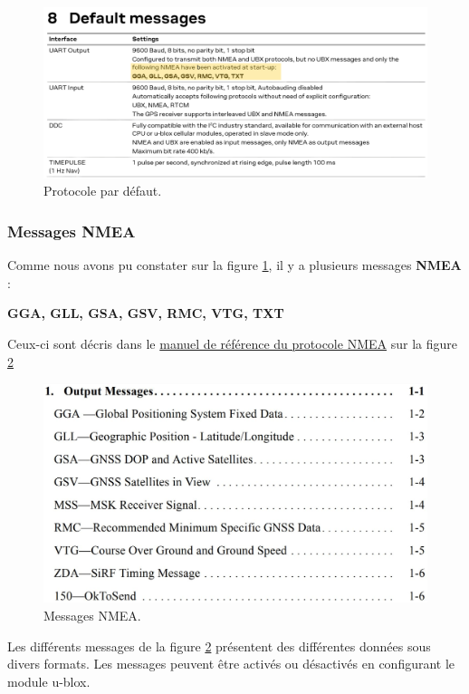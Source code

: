 \begin{figure}[!h]
	\centering
	\includegraphics[width=1\linewidth]{../figures/code/Default-messages}
	\caption{Protocole par défaut.}
	\label{fig:default-messages}
\end{figure}

\clearpage

\subsubsection{Messages NMEA}
Comme nous avons pu constater sur la figure \ref{fig:default-messages}, il y a plusieurs messages \textbf{NMEA} : 

\textbf{GGA, GLL, GSA, GSV, RMC, VTG, TXT}

Ceux-ci sont décris dans le \href{https://www.ekf.de/c/cgps/cg2/inf/nmea_reference_manual.pdf}{manuel de référence du protocole NMEA} sur la figure \ref{fig:messages-nmea}

\begin{figure}[h]
	\centering
	\includegraphics[width=0.55\linewidth]{../figures/code/Messages-NMEA}
	\caption{Messages NMEA.}
	\label{fig:messages-nmea}
\end{figure}

Les différents messages de la figure \ref{fig:messages-nmea} présentent des différentes données sous divers formats. Les messages peuvent être activés ou désactivés en configurant le module u-blox.

